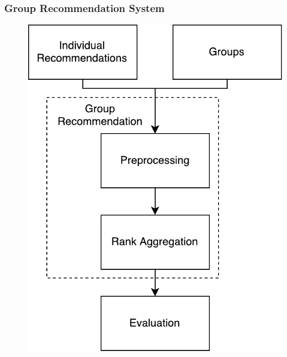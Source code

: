 \begin{frame}
\frametitle{Group Recommendation System}
\begin{figure}
\centering
\includegraphics[scale=.5]{graphics/composition}
\end{figure}
\end{frame}

